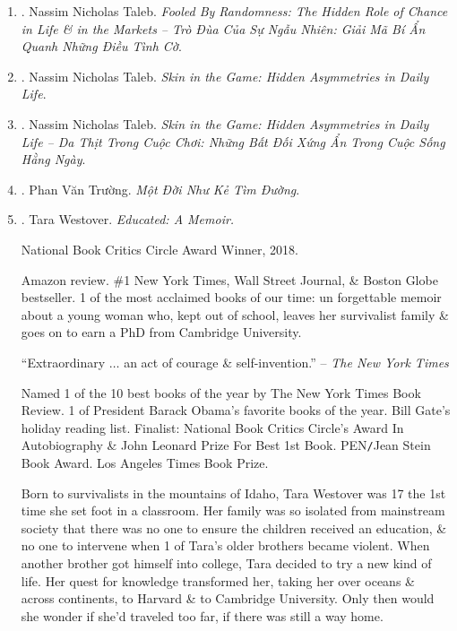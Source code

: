 \documentclass{article}
\begin{document}
\begin{enumerate}
	\item \cite{Taleb_randomness_VN}. Nassim Nicholas Taleb. {\it Fooled By Randomness: The Hidden Role of Chance in Life \& in the Markets -- Trò Đùa Của Sự Ngẫu Nhiên: Giải Mã Bí Ẩn Quanh Những Điều Tình Cờ}.\hfill{\sf[done]}
	
	\item \cite{Taleb_skin_game}. Nassim Nicholas Taleb. {\it Skin in the Game: Hidden Asymmetries in Daily Life}.
	
	\item \cite{Taleb_skin_game_VN}. Nassim Nicholas Taleb. {\it Skin in the Game: Hidden Asymmetries in Daily Life -- Da Thịt Trong Cuộc Chơi: Những Bất Đối Xứng Ẩn Trong Cuộc Sống Hằng Ngày}.\hfill{\sf[reading]}
	
	\item \cite{Truong_ke_tim_duong}. Phan Văn Trường. {\it Một Đời Như Kẻ Tìm Đường}.\hfill{\sf[done]}
	
	\item \cite{Westover_educated}. {\sc Tara Westover}. {\it Educated: A Memoir.} {}
	
	National Book Critics Circle Award Winner, 2018.
	
	{\sf Amazon review.} \#1 New York Times, Wall Street Journal, \& Boston Globe bestseller. 1 of the most acclaimed books of our time: un forgettable memoir about a young woman who, kept out of school, leaves her survivalist family \& goes on to earn a PhD from Cambridge University.
	
	``Extraordinary $\ldots$ an act of courage \& self-invention.'' -- {\it The New York Times}
	
	Named 1 of the 10 best books of the year by The New York Times Book Review. 1 of President {\sc Barack Obama}'s favorite books of the year. {\sc Bill Gate}'s holiday reading list. Finalist: National Book Critics Circle's Award In Autobiography \& John Leonard Prize For Best 1st Book. PEN{\tt/}Jean Stein Book Award. Los Angeles Times Book Prize.
	
	Born to survivalists in the mountains of Idaho, {\sc Tara Westover} was 17 the 1st time she set foot in a classroom. Her family was so isolated from mainstream society that there was no one to ensure the children received an education, \& no one to intervene when 1 of {\sc Tara}'s older brothers became violent. When another brother got himself into college, {\sc Tara} decided to try a new kind of life. Her quest for knowledge transformed her, taking her over oceans \& across continents, to Harvard \& to Cambridge University. Only then would she wonder if she'd traveled too far, if there was still a way home.
	

\end{enumerate}
\end{document}
